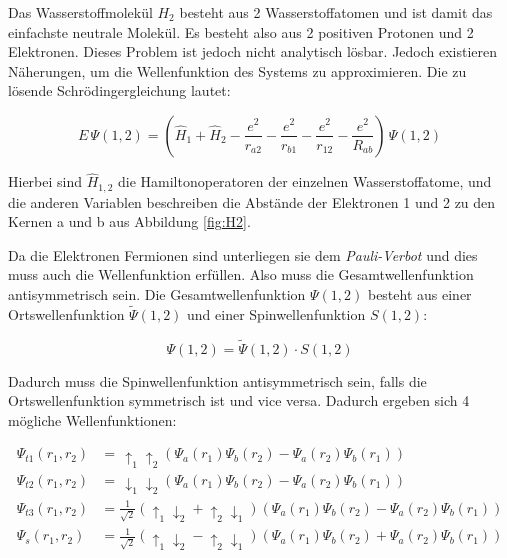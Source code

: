Das Wasserstoffmolekül $H_2$ besteht aus 2 Wasserstoffatomen und ist damit das einfachste neutrale Molekül. Es besteht also aus 2 positiven Protonen und 2 Elektronen. Dieses Problem ist jedoch nicht analytisch lösbar. Jedoch existieren Näherungen, um die Wellenfunktion des Systems zu approximieren. Die zu lösende Schrödingergleichung lautet:

\begin{equation}
    E \, \Psi (1, 2) = \left( \hat{H}_1 + \hat{H}_2 - \frac{e^2}{r_{a2}} - \frac{e^2}{r_{b1}} - \frac{e^2}{r_{12}} - \frac{e^2}{R_{ab}} \right) \, \Psi (1, 2)
    \label{eqn:H2}
\end{equation}

Hierbei sind $\hat{H}_{1,2}$ die Hamiltonoperatoren der einzelnen Wasserstoffatome, und die anderen Variablen beschreiben die Abstände der Elektronen 1 und 2 zu den Kernen a und b aus Abbildung \ref{fig:H2}.


Da die Elektronen Fermionen sind unterliegen sie dem \textit{Pauli-Verbot} und dies muss auch die Wellenfunktion erfüllen. Also muss die Gesamtwellenfunktion antisymmetrisch sein. Die Gesamtwellenfunktion $\Psi (1,2)$ besteht aus einer Ortswellenfunktion $\tilde{\Psi} (1,2)$ und einer Spinwellenfunktion $S (1,2)$:

\begin{equation}
    \Psi (1,2) = \tilde{\Psi} (1,2) \cdot S (1,2)
    \label{eqn:gesamt}
\end{equation}

Dadurch muss die Spinwellenfunktion antisymmetrisch sein, falls die Ortswellenfunktion symmetrisch ist und vice versa. Dadurch ergeben sich 4 mögliche Wellenfunktionen:

\begin{align}
    \Psi_{t1} (r_1, r_2) &= \, \uparrow_1 \uparrow_2 \left( \Psi_a (r_1) \Psi_b (r_2) - \Psi_a (r_2) \Psi_b (r_1) \right) \\
    \Psi_{t2} (r_1, r_2) &= \, \downarrow_1 \downarrow_2 \left( \Psi_a (r_1) \Psi_b (r_2) - \Psi_a (r_2) \Psi_b (r_1) \right) \\
    \Psi_{t3} (r_1, r_2) &= \frac{1}{\sqrt{2}} \left( \uparrow_1 \downarrow_2 + \uparrow_2 \downarrow_1 \right) \left( \Psi_a (r_1) \Psi_b (r_2) - \Psi_a (r_2) \Psi_b (r_1) \right) \\
    \Psi_{s} (r_1, r_2) &= \frac{1}{\sqrt{2}} \left( \uparrow_1 \downarrow_2 - \uparrow_2 \downarrow_1 \right) \left( \Psi_a (r_1) \Psi_b (r_2) + \Psi_a (r_2) \Psi_b (r_1) \right)
\end{align}

